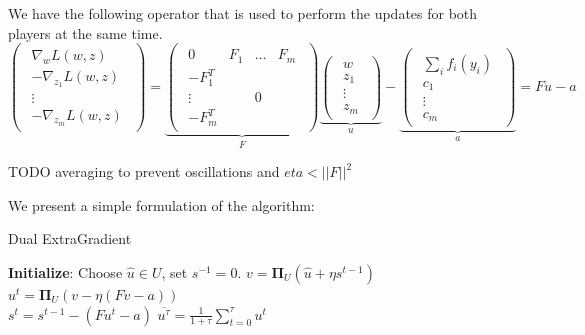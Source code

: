We have the following operator that is used to perform the updates for
both players at the same time.
\begin{equation}
  \begin{pmatrix}
    \begin{array}{c} \nabla_{ w} {L}( w, z)\\
      -\nabla_{ z_1} {L}( w, z)\\
      \vdots\\
      -\nabla_{ z_m} {L}( w, z)
    \end{array}
  \end{pmatrix} =
  \underbrace{
    \begin{pmatrix}
      \begin{array}{cccc}
        0 &  F_1 & \dots &  F_m\\
        - F_1^T & & &\\
        \vdots & &  0 &\\
        - F_m^T & & &
      \end{array}
    \end{pmatrix}}_{ F}
  \underbrace{
    \begin{pmatrix}
      \begin{array}{c}
         w\\
         z_1\\
        \vdots\\
         z_m
      \end{array}
    \end{pmatrix}}_{ u}-
  \underbrace{
    \begin{pmatrix}
      \begin{array}{c}
        \sum_i  f_i( y_i)\\
         c_1\\
        \vdots\\
         c_m
      \end{array}
    \end{pmatrix}}_{ a} =  F  u -  a
  \end{equation}

TODO averaging to prevent oscillations and $eta<||F||^2$

We present a simple formulation of the algorithm:
\begin{algorithm}
  \caption{Dual ExtraGradient}
  \label{alg:extra}
\begin{algorithmic}
  \STATE \textbf{Initialize}: Choose $\hat{ u} \in {U}$, set $ s^{-1} = 0$.
  \STATE $ v = \mathbf{\Pi}_{{U}}(\hat{ u} + \eta  s^{t-1})$\\
  \STATE $ u^t = \mathbf{\Pi}_{{U}}( v - \eta ( F  v -  a))$\\
  \STATE $ s^t =   s^{t-1} - ( F  u^t -  a)$
  \ENDFOR
  \RETURN $\overline{ u^{\tau}} = \frac{1}{1 + \tau} \sum_{t=0}^{\tau}  u^t$
\end{algorithmic}
\end{algorithm}

